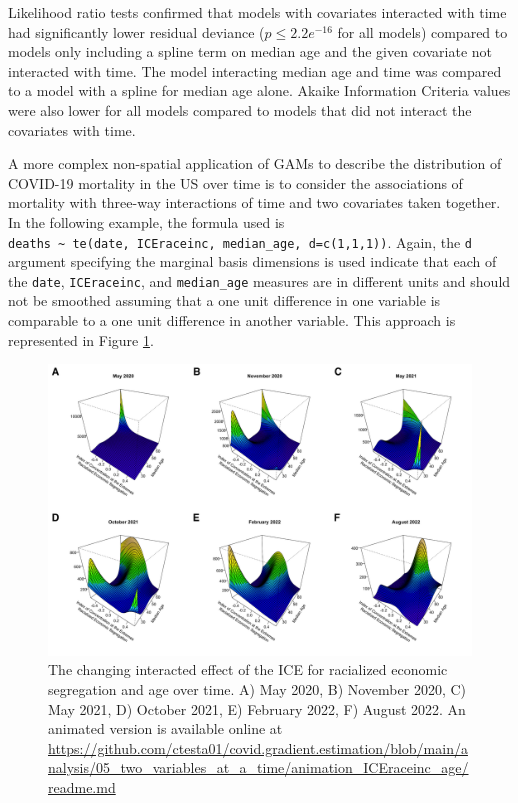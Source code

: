 \documentclass[
]{article}
\begin{document}
Likelihood ratio tests confirmed that models with covariates interacted with
time had significantly lower residual deviance (\(p \leq 2.2e^{-16}\) for all
models) compared to models only including a spline term on median age and the
given covariate not interacted with time. The model interacting median age
and time was compared to a model with a spline for median age alone. Akaike Information
Criteria values were also lower for all models compared to models that did
not interact the covariates with time.

A more complex non-spatial application of GAMs to describe the distribution of
COVID-19 mortality in the US over time is to consider the associations of
mortality with three-way interactions of time and two covariates taken together.
In the following example, the formula used is \texttt{deaths\ \textasciitilde{}\ te(date,\ ICEraceinc,\ median\_age,\ d=c(1,1,1))}. Again, the \texttt{d} argument specifying the marginal
basis dimensions is used indicate that each of the \texttt{date}, \texttt{ICEraceinc}, and
\texttt{median\_age} measures are in different units and should not be smoothed assuming
that a one unit difference in one variable is comparable to a one unit difference
in another variable. This approach is represented in Figure \ref{fig:two-variables-over-time}.

\begin{figure}
\includegraphics[width=1\linewidth]{figures/ICEraceinc_age_panel_figure} \caption{The changing interacted effect of the ICE for racialized economic segregation and age over time. A) May 2020, B) November 2020, C) May 2021, D) October 2021, E) February 2022, F) August 2022. An animated version is available online at \url{https://github.com/ctesta01/covid.gradient.estimation/blob/main/analysis/05_two_variables_at_a_time/animation_ICEraceinc_age/readme.md}}\label{fig:two-variables-over-time}
\end{figure}
\end{document}
